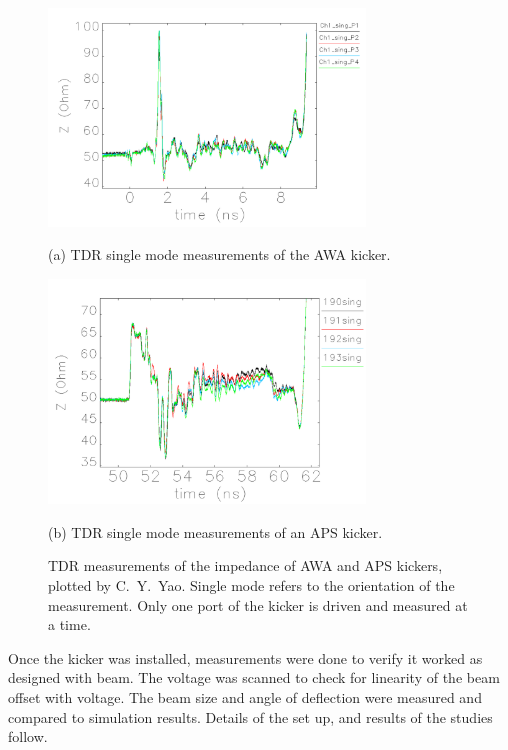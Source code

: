 	\begin{figure}
		\begin{center}
			\includegraphics[width=0.75\textwidth]{./images/TDR_AWA_kicker}
			
			(a) TDR single mode measurements of the AWA kicker.
		\end{center}
		\begin{center}
		\includegraphics[width=0.75\textwidth]{./images/TDR_APS_kicker}
	
		(b) TDR single mode measurements of an APS kicker.
		\caption{TDR measurements of the impedance of AWA and APS kickers, plotted by C.~Y.~Yao.
		Single mode refers to the orientation of the measurement. 
		Only one port of the kicker is driven and measured at a time. }\label{fig:TDR}		
		\end{center}
	
	\end{figure}



Once the kicker was installed, measurements were done to verify it worked as designed with beam.  
The voltage was scanned to check for linearity of the beam offset with voltage.  
The beam size and angle of deflection were measured and compared to simulation results.  
Details of the set up, and results of the studies follow.

